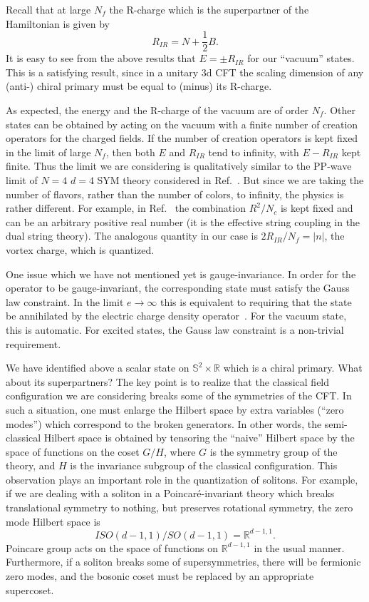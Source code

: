 \documentclass[a4paper,12pt, amsfonts, amssymb]{article}
\newcommand{\RR}{{\mathbb R}}
\renewcommand{\SS}{{\mathbb S}}
\newcommand{\ra}{\rightarrow}
\begin{document}
Recall that at large $N_f$ the R-charge which is the superpartner of the
Hamiltonian is given by
$$
R_{IR}=N+\frac{1}{2}B.
$$
It is easy to see from the above results that $E=\pm R_{IR}$ 
for our ``vacuum'' states. This is a satisfying result, since in a unitary 
3d CFT the scaling dimension of any (anti-) chiral primary must be equal to 
(minus) its R-charge.

As expected, the energy and the R-charge of the vacuum are of order
$N_f$. Other states can be obtained by acting on the vacuum with a finite
number of creation operators for the charged fields. If the number of
creation operators is kept fixed in the limit of large $N_f$, then
both $E$ and $R_{IR}$ tend to infinity, with $E-R_{IR}$ kept finite. Thus the limit we are considering is qualitatively similar to the PP-wave limit of
$N=4$ $d=4$ SYM theory considered in Ref.~\cite{BMN}. But since we are
taking the number of flavors, rather than the number of colors, to
infinity, the physics is rather different. For example, in Ref.~\cite{BMN}
the combination $R^2/N_c$ is kept fixed and can be an arbitrary positive real number (it is the effective string coupling in the dual string theory). 
The analogous quantity in our case is $2R_{IR}/N_f=|n|$, the vortex charge, 
which is quantized.


One issue which we have not mentioned yet is gauge-invariance.
In order for the operator to be gauge-invariant, the corresponding state
must satisfy the Gauss law constraint. In the limit $e\ra\infty$
this is equivalent to requiring that the state be annihilated by
the electric charge density operator~\cite{BKWone}. For the vacuum state, 
this is automatic.
For excited states, the Gauss law constraint is a non-trivial requirement.

We have identified above a scalar state on $\SS^2\times \RR$ which is
a chiral primary. What about its superpartners? The key point is to realize
that the classical field configuration we are considering breaks some
of the symmetries of the CFT. In such a situation, one must enlarge the
Hilbert space by extra variables (``zero modes'') which correspond to
the broken generators. In other words, the semi-classical Hilbert space is
obtained by tensoring the ``naive'' Hilbert space by the space of functions
on the coset $G/H$, where $G$ is the symmetry group of the theory, and
$H$ is the invariance subgroup of the classical configuration. This observation
plays an important role in the quantization of solitons. For example, if we
are dealing with a soliton in a Poincar\'{e}-invariant theory which breaks translational symmetry to nothing, but preserves rotational symmetry, the zero
mode Hilbert space is 
$$
ISO(d-1,1)/SO(d-1,1)=\RR^{d-1,1}.
$$
Poincare group acts on the space of functions on $\RR^{d-1,1}$ in the usual
manner. Furthermore, if a soliton breaks some of supersymmetries, there will
be fermionic zero modes, and the bosonic coset must be replaced by an
appropriate supercoset. 
\end{document}
